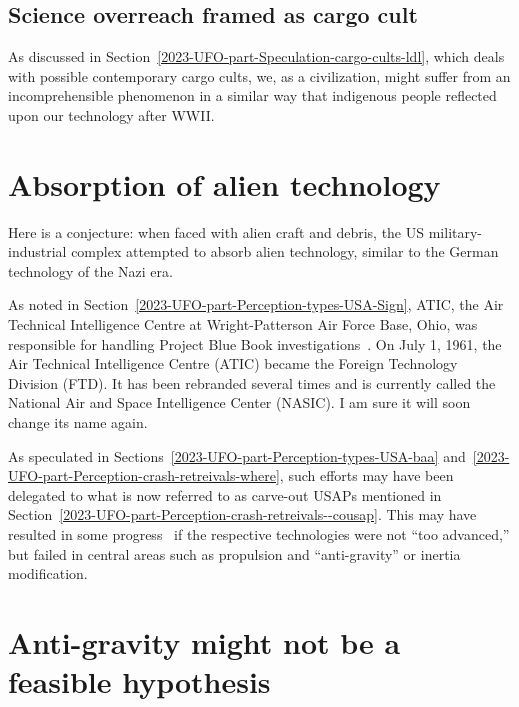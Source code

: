\subsection{Science overreach framed as cargo cult}

As discussed in Section~\ref{2023-UFO-part-Speculation-cargo-cults-ldl}, which deals with possible contemporary cargo cults,
we, as a civilization, might suffer from an incomprehensible phenomenon in a similar way that indigenous people reflected upon our technology after WWII.



\section{Absorption of alien technology}
\label{2023-UFO-part-Perception-flight-characteristics-aat}



Here is a conjecture: when faced with alien craft and debris, the US military-industrial complex attempted to absorb alien technology,
similar to the German technology of the Nazi era.



As noted in Section~\ref{2023-UFO-part-Perception-types-USA-Sign},
ATIC, the Air Technical Intelligence Centre at Wright-Patterson Air Force Base, Ohio, was responsible for handling Project Blue Book investigations~\cite[Chapter~3]{Ruppelt2011May}.
On July 1, 1961, the Air Technical Intelligence Centre (ATIC) became the Foreign Technology Division (FTD).
It has been rebranded several times and is currently called the National Air and Space Intelligence Center (NASIC). I am sure it will soon change its name again.

As speculated in Sections~\ref{2023-UFO-part-Perception-types-USA-baa}
and~\ref{2023-UFO-part-Perception-crash-retreivals-where},
such efforts may have been delegated to what is now referred to as carve-out USAPs mentioned in Section~\ref{2023-UFO-part-Perception-crash-retreivals--cousap}.
This may have resulted in some progress~\cite{Corso1998Jun} if the respective technologies were not ``too advanced,'' but failed in central areas such as propulsion and ``anti-gravity'' or inertia modification.


\section{Anti-gravity might not be a feasible hypothesis}
\label{2023-UFO-part-Perception-flight-characteristics-ag}

